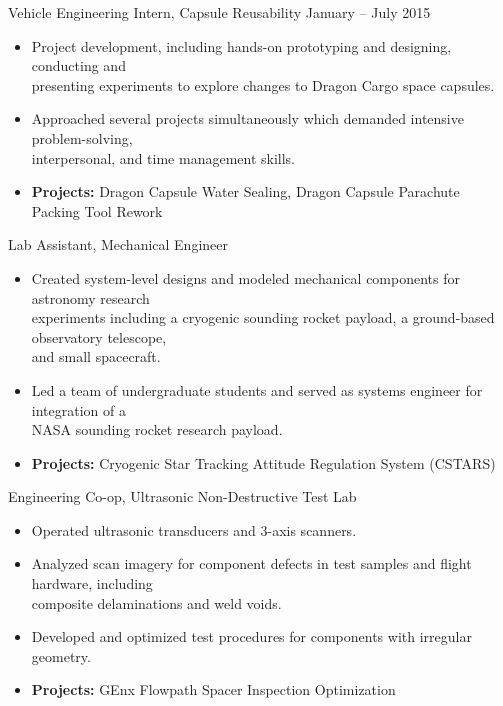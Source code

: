 \documentclass[10pt,final,sans]{resume}
\begin{document}
{Vehicle Engineering Intern, Capsule Reusability \hfill January -- July 2015
\begin{itemize}
  \item Project development, including hands-on prototyping and designing, conducting and \\
  presenting experiments to explore changes to Dragon Cargo space capsules.
  \item Approached several projects simultaneously which demanded intensive problem-solving, \\
  interpersonal, and time management skills.
  \item {\bf Projects:} Dragon Capsule Water Sealing, Dragon Capsule Parachute Packing Tool Rework
\end{itemize}

Lab Assistant, Mechanical Engineer
\begin{itemize}
  \item Created system-level designs and modeled mechanical components for astronomy research \\ 
  experiments including a cryogenic sounding rocket payload, a ground-based observatory telescope, \\
  and small spacecraft.
  \item Led a team of undergraduate students and served as systems engineer for integration of a \\
  NASA sounding rocket research payload.
  \item {\bf Projects:} Cryogenic Star Tracking Attitude Regulation System (CSTARS)
\end{itemize}

Engineering Co-op, Ultrasonic Non-Destructive Test Lab
\begin{itemize}
  \item Operated ultrasonic transducers and 3-axis scanners.
  \item Analyzed scan imagery for component defects in test samples and flight hardware, including \\
  composite delaminations and weld voids.
  \item Developed and optimized test procedures for components with irregular geometry.
  \item {\bf Projects:} GEnx Flowpath Spacer Inspection Optimization
\end{itemize}

}
\end{document}
